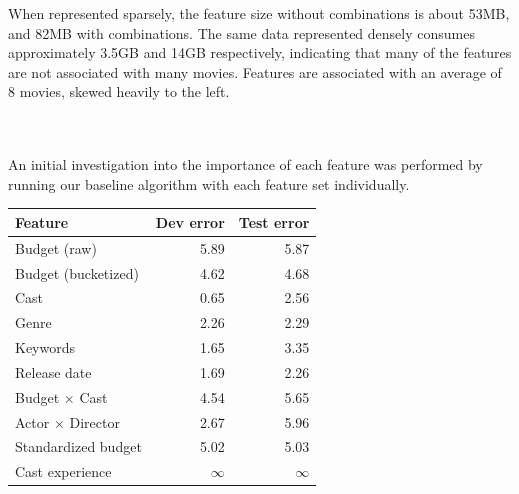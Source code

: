 \documentclass[journal]{IEEEtran}
\begin{document}
When represented sparsely, the feature size without combinations is about 53MB, and 82MB with combinations.  The same data represented
densely consumes approximately 3.5GB and 14GB respectively, indicating that many of the features are not associated with many movies.  Features are associated with an average of 8 movies, skewed heavily to the left. \\
\\
\\
\par An initial investigation into the importance of each feature was performed by
running our baseline algorithm with each feature set individually.\\

\begin{center}
\begin{tabular}{|l|r r|} %
\hline
Feature & Dev error & Test error \\ [0.5ex] %
\hline %
Budget (raw) & 5.89 & 5.87 \\ %
Budget (bucketized) & 4.62 & 4.68 \\
Cast & 0.65 & 2.56 \\
Genre & 2.26 & 2.29 \\
Keywords & 1.65 & 3.35 \\
Release date & 1.69 & 2.26 \\
\hline
Budget $\times$ Cast & 4.54 & 5.65 \\
Actor $\times$ Director & 2.67 & 5.96 \\
\hline
Standardized budget & 5.02 & 5.03 \\
Cast experience & $\infty$ & $\infty$ \\
\hline
\end{tabular}
\end{center}
\smallskip
\end{document}
